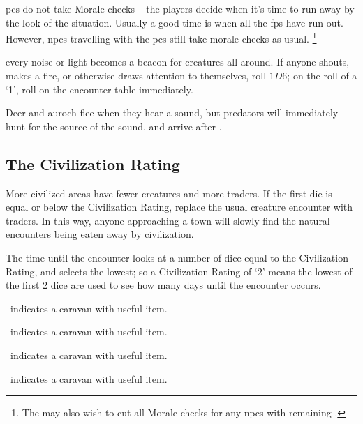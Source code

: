 \begin{multicols}{2}
\Glspl{pc} do not take Morale checks -- the players decide when it's time to run away by the look of the situation.
Usually a good time is when all the \glspl{fp} have run out.
%
However, \glspl{npc} travelling with the \glspl{pc} still take morale checks as usual.%
\footnote{The  may also wish to cut all Morale checks for any \glspl{npc} with remaining .}%

every noise or light becomes a beacon for creatures all around.
If anyone shouts, makes a fire, or otherwise draws attention to themselves, roll $1D6$; on the roll of a `1', roll on the encounter table immediately.

Deer and auroch flee when they hear a sound, but predators will immediately hunt for the source of the sound, and arrive after .

\subsection{The Civilization Rating}
\label{civilizationRating}

More civilized areas have fewer creatures and more traders.
If the first die is equal or below the Civilization Rating, replace the usual creature encounter with traders.
In this way, anyone approaching a town will slowly find the natural encounters being eaten away by civilization.

The time until the encounter looks at a number of dice equal to the Civilization Rating, and selects the lowest; so a Civilization Rating of `2' means the lowest of the first 2 dice are used to see how many days until the encounter occurs.

\setcounter{encnum}{1}
\begin{dlist}
  \item
  \encCivilization\ indicates a caravan with  useful item.

  \item
  \encCivilization\ indicates a caravan with  useful item.

  \item
  \encCivilization\ indicates a caravan with  useful item.

  \item
  \encCivilization\ indicates a caravan with  useful item.


\end{dlist}
\end{multicols}
